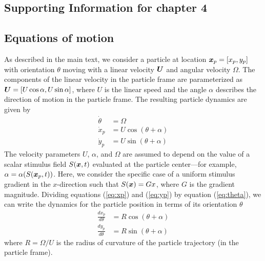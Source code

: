 \begin{appendices}



\chapter{Supporting Information for chapter 4}


\section{Equations of motion}

As described in the main text, we consider a particle at location $\boldsymbol{x}_p=[x_p,y_p]$ with orientation $\theta$ moving with a linear velocity $\boldsymbol{U}$ and angular velocity $\Omega$.  The components of the linear velocity in the particle frame are parameterized as $\boldsymbol{U}=[U \cos\alpha, U\sin \alpha]$, where $U$ is the linear speed and the angle $\alpha$ describes the direction of motion in the particle frame.  The resulting particle dynamics are given by
\begin{align}
    \dot{\theta} &= \Omega \label{eq:theta}
    \\ 
    \dot{x}_p &= U \cos(\theta + \alpha) \label{eq:xp} 
    \\ 
    \dot{y}_p &= U \sin(\theta + \alpha)\label{eq:yp}
\end{align}	
The velocity parameters $U$, $\alpha$, and $\Omega$ are assumed to depend on the value of a scalar stimulus field $S(\boldsymbol{x},t)$ evaluated at the particle center---for example, $\alpha=\alpha(S(\boldsymbol{x}_p,t))$. Here, we consider the specific case of a uniform stimulus gradient in the $x$-direction such that $S(\boldsymbol{x})= G x$, where $G$ is the gradient magnitude. Dividing equations (\ref{eq:xp}) and (\ref{eq:yp}) by equation (\ref{eq:theta}), we can write the dynamics for the particle position in terms of its orientation $\theta$ 
\begin{align}
    \frac{d x_p}{d\theta} &= R \cos(\theta + \alpha) \label{eq:xp2} 
    \\ 
    \frac{d y_p}{d\theta} &= R \sin(\theta + \alpha)\label{eq:yp2}
\end{align}	
where $R=\Omega/U$ is the radius of curvature of the particle trajectory (in the particle frame). 


\end{appendices}
